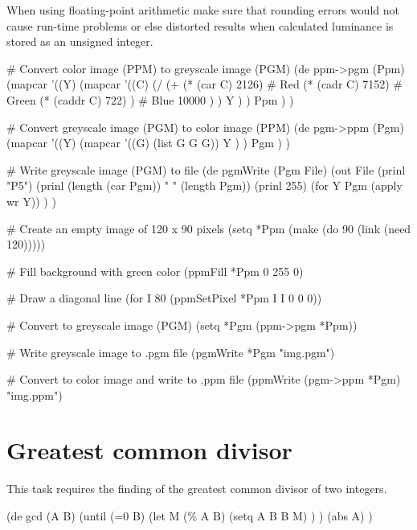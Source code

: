 When using floating-point arithmetic make sure that rounding errors
would not cause run-time problems or else distorted results when
calculated luminance is stored as an unsigned integer.

\begin{wideverbatim}

# Convert color image (PPM) to greyscale image (PGM)
(de ppm->pgm (Ppm)
   (mapcar
      '((Y)
         (mapcar
            '((C)
               (/
                  (+
                     (* (car C) 2126)  # Red
                     (* (cadr C) 7152)  # Green
                     (* (caddr C) 722) )  # Blue
                  10000 ) )
            Y ) )
      Ppm ) )

# Convert greyscale image (PGM) to color image (PPM)
(de pgm->ppm (Pgm)
   (mapcar
      '((Y)
         (mapcar
            '((G) (list G G G))
            Y ) )
      Pgm ) )

# Write greyscale image (PGM) to file
(de pgmWrite (Pgm File)
   (out File
      (prinl "P5")
      (prinl (length (car Pgm)) " " (length Pgm))
      (prinl 255)
      (for Y Pgm (apply wr Y)) ) )

# Create an empty image of 120 x 90 pixels
(setq *Ppm (make (do 90 (link (need 120)))))

# Fill background with green color
(ppmFill *Ppm 0 255 0)

# Draw a diagonal line
(for I 80 (ppmSetPixel *Ppm I I 0 0 0))


# Convert to greyscale image (PGM)
(setq *Pgm (ppm->pgm *Ppm))

# Write greyscale image to .pgm file
(pgmWrite *Pgm "img.pgm")

# Convert to color image and write to .ppm file
(ppmWrite (pgm->ppm *Pgm) "img.ppm")

\end{wideverbatim}

\pagebreak{}
\section*{Greatest common divisor}

This task requires the finding of the greatest common divisor of two
integers.

\begin{wideverbatim}

(de gcd (A B)
   (until (=0 B)
      (let M (\% A B)
         (setq A B B M) ) )
   (abs A) )

\end{wideverbatim}

